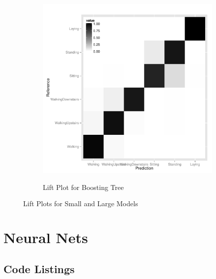 \begin{landscape}
\begin{figure}
\begin{subfigure}[b]{0.45\textwidth}
    \label{fig:lift_rf}
  \end{subfigure}
  \hfill
    \begin{subfigure}[b]{0.45\textwidth}
    \caption{Lift Plot for Boosting Tree}
    \includegraphics[width=\textwidth]{heatmap_boost.pdf}
    \label{fig:lift_boost}
  \end{subfigure}
  \caption{Lift Plots for Small and Large Models}
\end{figure}
\end{landscape}


\section{Neural Nets} \label{nnets}




\clearpage
\begin{appendices}
\section{Code Listings}

\end{appendices}



% 



